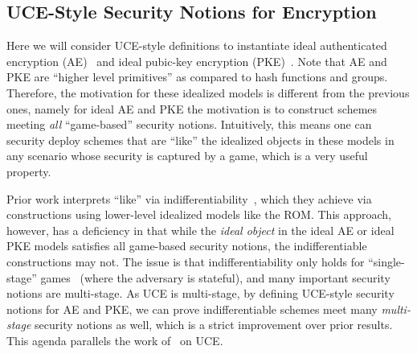 {\begin{itemize}
\iffalse
 \subsection{UCE-Style Security Notions for Encryption}

 Here we will  consider UCE-style definitions to instantiate   ideal authenticated encryption (AE)~\cite{C:BarFar18} and ideal pubic-key encryption (PKE)~\cite{C:ZhaZha20}. Note that AE and PKE are ``higher level primitives'' as compared to hash functions and groups. Therefore, the  motivation for these idealized models is different from the previous ones, namely for ideal AE and PKE the motivation is to construct schemes meeting \emph{all} ``game-based'' security notions. Intuitively, this means one can security deploy schemes that are ``like'' the idealized objects in these models in any scenario whose security is captured by a game, which is a very useful property.  %

Prior work interprets ``like'' via  indifferentiability~\cite{TCC:MauRenHol04}, which they achieve via constructions using lower-level idealized models like the ROM.  This approach, however, has a deficiency in that while the \emph{ideal object} in the ideal AE or ideal PKE models satisfies all game-based  security notions, the indifferentiable  constructions may not. The  issue is that indifferentiability only holds for ``single-stage'' games~\cite{EC:RisShaShr11} (where the adversary is stateful), and many important security notions are multi-stage. As UCE is multi-stage, by defining UCE-style security notions  for AE and PKE, we can prove indifferentiable schemes  meet many \emph{multi-stage} security notions as well, which is a strict improvement over prior results. This agenda parallels the work of~\cite{C:BelHoaKee14} on UCE.




\end{itemize}}
